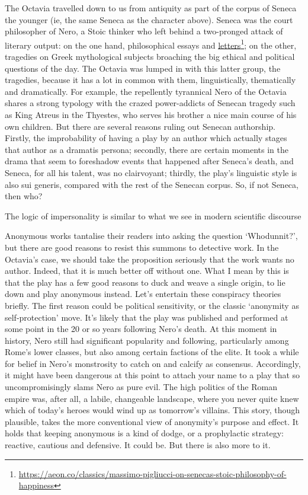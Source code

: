 \documentclass[../main.tex]{subfiles}
\begin{document}
\begin{multicols}{2}
The Octavia travelled down to us from antiquity as part of the corpus of Seneca the younger (ie, the same Seneca as the character above). Seneca was the court philosopher of Nero, a Stoic thinker who left behind a two-pronged attack of literary output: on the one hand, philosophical essays and \href{https://aeon.co/classics/massimo-pigliucci-on-senecas-stoic-philosophy-of-happiness}{letters}\footnote{\url{https://aeon.co/classics/massimo-pigliucci-on-senecas-stoic-philosophy-of-happiness}}; on the other, tragedies on Greek mythological subjects broaching the big ethical and political questions of the day. The Octavia was lumped in with this latter group, the tragedies, because it has a lot in common with them, linguistically, thematically and dramatically. For example, the repellently tyrannical Nero of the Octavia shares a strong typology with the crazed power-addicts of Senecan tragedy such as King Atreus in the Thyestes, who serves his brother a nice main course of his own children. But there are several reasons ruling out Senecan authorship. Firstly, the improbability of having a play by an author which actually stages that author as a dramatis persona; secondly, there are certain moments in the drama that seem to foreshadow events that happened after Seneca’s death, and Seneca, for all his talent, was no clairvoyant; thirdly, the play’s linguistic style is also sui generis, compared with the rest of the Senecan corpus. So, if not Seneca, then who? 

\begin{pullquote}
 The logic of impersonality is similar to what we see in modern scientific discourse 
\end{pullquote}

Anonymous works tantalise their readers into asking the question ‘Whodunnit?’, but there are good reasons to resist this summons to detective work. In the Octavia’s case, we should take the proposition seriously that the work wants no author. Indeed, that it is much better off without one. What I mean by this is that the play has a few good reasons to duck and weave a single origin, to lie down and play anonymous instead. Let’s entertain these conspiracy theories briefly. The first reason could be political sensitivity, or the classic ‘anonymity as self-protection’ move. It’s likely that the play was published and performed at some point in the 20 or so years following Nero’s death. At this moment in history, Nero still had significant popularity and following, particularly among Rome’s lower classes, but also among certain factions of the elite. It took a while for belief in Nero’s monstrosity to catch on and calcify as consensus. Accordingly, it might have been dangerous at this point to attach your name to a play that so uncompromisingly slams Nero as pure evil. The high politics of the Roman empire was, after all, a labile, changeable landscape, where you never quite knew which of today’s heroes would wind up as tomorrow’s villains. This story, though plausible, takes the more conventional view of anonymity’s purpose and effect. It holds that keeping anonymous is a kind of dodge, or a prophylactic strategy: reactive, cautious and defensive. It could be. But there is also more to it. 


\end{multicols}
\end{document}
